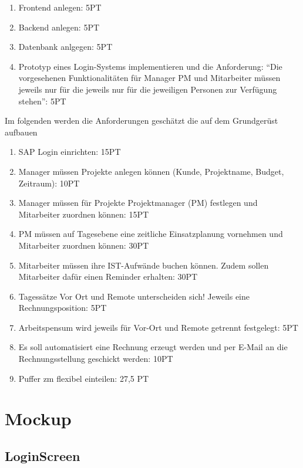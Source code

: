 \documentclass{article}
\begin{document}
\begin{enumerate}
    \item Frontend anlegen: 5PT
    \item Backend anlegen: 5PT
    \item Datenbank anlgegen: 5PT
    \item Prototyp eines Login-Systems implementieren und die Anforderung: “Die
          vorgesehenen Funktionalitäten für Manager PM und Mitarbeiter müssen jeweils nur
          für die jeweils nur für die jeweiligen Personen zur Verfügung stehen”: 5PT
\end{enumerate}

Im folgenden werden die Anforderungen geschätzt die auf dem Grundgerüst
aufbauen

\begin{enumerate}
    \item SAP Login einrichten: 15PT
    \item Manager müssen Projekte anlegen können (Kunde, Projektname, Budget, Zeitraum):
          10PT
    \item Manager müssen für Projekte Projektmanager (PM) festlegen und Mitarbeiter
          zuordnen können: 15PT
    \item PM müssen auf Tagesebene eine zeitliche Einsatzplanung vornehmen und
          Mitarbeiter zuordnen können: 30PT
    \item Mitarbeiter müssen ihre IST-Aufwände buchen können. Zudem sollen Mitarbeiter
          dafür einen Reminder erhalten: 30PT
    \item Tagessätze Vor Ort und Remote unterscheiden sich! Jeweils eine
          Rechnungsposition: 5PT
    \item Arbeitspensum wird jeweils für Vor-Ort und Remote getrennt festgelegt: 5PT
    \item Es soll automatisiert eine Rechnung erzeugt werden und per E-Mail an die
          Rechnungsstellung geschickt werden: 10PT
    \item Puffer zm flexibel einteilen: 27,5 PT

\end{enumerate}

\newpage

\section{Mockup}
\subsection{LoginScreen}
\end{document}
